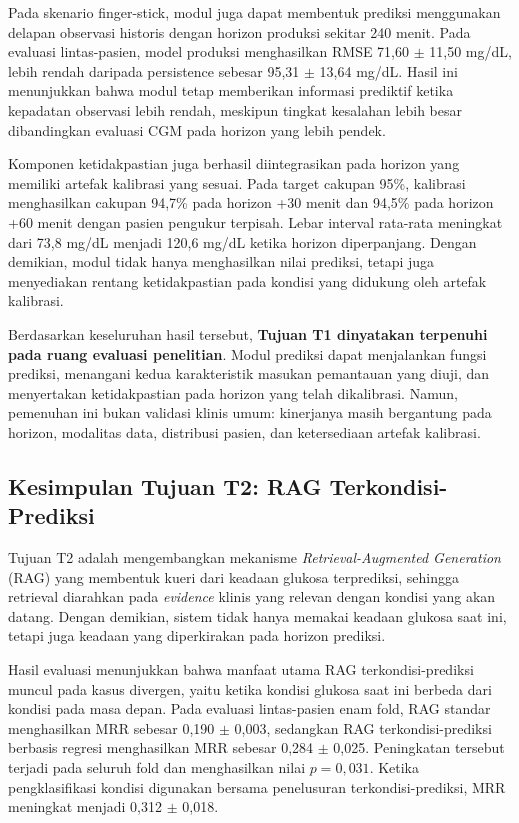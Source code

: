 Pada skenario finger-stick, modul juga dapat membentuk prediksi menggunakan delapan observasi historis dengan horizon produksi sekitar 240 menit.
Pada evaluasi lintas-pasien, model produksi menghasilkan RMSE 71,60 $\pm$ 11,50 mg/dL, lebih rendah daripada persistence sebesar
95,31 $\pm$ 13,64 mg/dL. Hasil ini menunjukkan bahwa modul tetap memberikan informasi prediktif ketika kepadatan observasi lebih rendah, meskipun
tingkat kesalahan lebih besar dibandingkan evaluasi CGM pada horizon yang lebih pendek.

Komponen ketidakpastian juga berhasil diintegrasikan pada horizon yang memiliki artefak kalibrasi yang sesuai. Pada target cakupan 95\%, kalibrasi
menghasilkan cakupan 94,7\% pada horizon +30 menit dan 94,5\% pada horizon +60 menit dengan pasien pengukur terpisah. Lebar interval rata-rata
meningkat dari 73,8 mg/dL menjadi 120,6 mg/dL ketika horizon diperpanjang. Dengan demikian, modul tidak hanya menghasilkan nilai prediksi, tetapi juga menyediakan rentang
ketidakpastian pada kondisi yang didukung oleh artefak kalibrasi.

Berdasarkan keseluruhan hasil tersebut, \textbf{Tujuan T1 dinyatakan terpenuhi pada ruang evaluasi penelitian}. Modul prediksi dapat menjalankan fungsi prediksi,
menangani kedua karakteristik masukan pemantauan yang diuji, dan menyertakan ketidakpastian pada horizon yang telah dikalibrasi. Namun, pemenuhan ini bukan
validasi klinis umum: kinerjanya masih bergantung pada horizon, modalitas data, distribusi pasien, dan ketersediaan artefak kalibrasi.

\subsection{Kesimpulan Tujuan T2: RAG Terkondisi-Prediksi}
\label{subsec:bab7-kesimpulan-t2}

Tujuan T2 adalah mengembangkan mekanisme \textit{Retrieval-Augmented Generation} (RAG) yang membentuk kueri dari keadaan glukosa terprediksi, sehingga
retrieval diarahkan pada \textit{evidence} klinis yang relevan dengan kondisi yang akan datang. Dengan demikian, sistem tidak hanya memakai keadaan glukosa
saat ini, tetapi juga keadaan yang diperkirakan pada horizon prediksi.

Hasil evaluasi menunjukkan bahwa manfaat utama RAG terkondisi-prediksi muncul pada kasus divergen, yaitu ketika kondisi glukosa saat ini berbeda dari
kondisi pada masa depan. Pada evaluasi lintas-pasien enam fold, RAG standar menghasilkan MRR sebesar 0,190 $\pm$ 0,003, sedangkan RAG
terkondisi-prediksi berbasis regresi menghasilkan MRR sebesar 0,284 $\pm$ 0,025. Peningkatan tersebut terjadi pada seluruh fold dan menghasilkan
nilai $p=0,031$. Ketika pengklasifikasi kondisi digunakan bersama penelusuran terkondisi-prediksi, MRR meningkat menjadi 0,312 $\pm$ 0,018.

